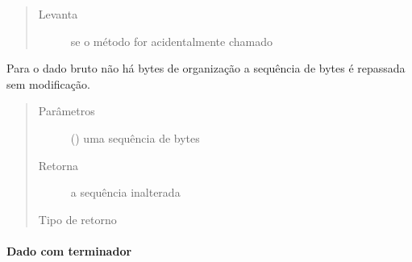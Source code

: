 \documentclass[letterpaper,10pt,brazil]{sphinxmanual}
\begin{document}
\begin{fulllineitems}
\begin{fulllineitems}
\begin{quote}
\begin{description}
\item[{Levanta}] \leavevmode
\sphinxAtStartPar
{} \textendash{} se o método for acidentalmente chamado

\end{description}\end{quote}

\end{fulllineitems}


\begin{fulllineitems}
\label{\detokenize{estrutarq.dado:estrutarq.dado.DadoBruto.remova_formatacao}}
\pysigstartsignatures
{}
\pysigstopsignatures
\sphinxAtStartPar
Para o dado bruto não há bytes de organização a sequência de bytes é
repassada sem modificação.
\begin{quote}\begin{description}
\item[{Parâmetros}] \leavevmode
\sphinxAtStartPar
{} () \textendash{} uma sequência de bytes

\item[{Retorna}] \leavevmode
\sphinxAtStartPar
a sequência inalterada

\item[{Tipo de retorno}] \leavevmode
\sphinxAtStartPar
{}

\end{description}\end{quote}

\end{fulllineitems}


\end{fulllineitems}



\paragraph{Dado com terminador}
\label{\detokenize{estrutarq.dado:dado-com-terminador}}
\end{document}
